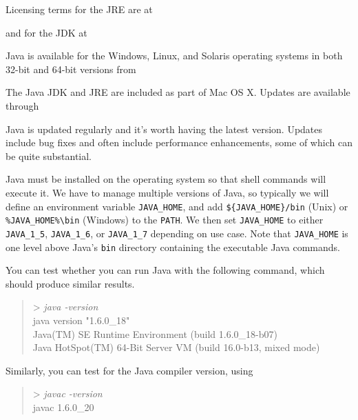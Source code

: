 Licensing terms for the JRE are at
%
\begin{quote}
\end{quote}
and for the JDK at
%
\begin{quote}
\end{quote}

Java is available for the Windows, Linux, and Solaris operating
systems in both 32-bit and 64-bit versions from
%
\begin{quote}
\end{quote}
%
The Java JDK and JRE are included as part of Mac OS X.  Updates are
available through
%
\begin{quote}
\end{quote}
%
Java is updated regularly and it's worth having the latest version.
Updates include bug fixes and often include performance enhancements,
some of which can be quite substantial.

Java must be installed on the operating system so that shell commands
will execute it.  We have to manage multiple versions of Java, so
typically we will define an environment variable {\tt JAVA\_HOME}, and
add {\tt \$\{JAVA\_HOME\}/bin} (Unix) or {\tt \%JAVA\_HOME\%{\textbackslash}bin} (Windows) 
to the {\tt PATH}.  We then set {\tt JAVA\_HOME} to either {\tt
JAVA\_1\_5}, {\tt JAVA\_1\_6}, or {\tt JAVA\_1\_7} depending on use
case.  Note that {\tt JAVA\_HOME} is one level above Java's {\tt bin}
directory containing the executable Java commands.

You can test whether you can run Java with the following command, which
should produce similar results.
%
\begin{quote}
{\small
\ttfamily
> {\it\ttfamily java -version}
\\
java version "1.6.0\_18"
\\
Java(TM) SE Runtime Environment (build 1.6.0\_18-b07)
\\
Java HotSpot(TM) 64-Bit Server VM (build 16.0-b13, mixed mode)
}
\end{quote}
%
Similarly, you can test for the Java compiler version, using
%
\begin{quote}
{\small\ttfamily
> {\it\ttfamily javac -version}
\\
javac 1.6.0\_20
}
\end{quote}


